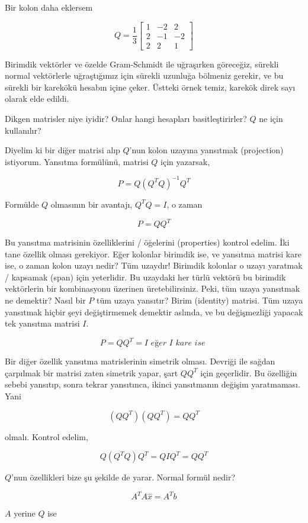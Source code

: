 \documentclass[12pt,fleqn]{article}\usepackage{../../common}
\begin{document}
Bir kolon daha eklersem 

$$Q = \frac{ 1}{3}
\left[\begin{array}{rrr}
1 & -2 & 2\\
2 & -1 & -2 \\
2 & 2 & 1
\end{array}\right]
$$

Birimdik vektörler ve özelde Gram-Schmidt ile uğraşırken göreceğiz,
sürekli normal vektörlerle uğraştığımız için sürekli uzunluğa bölmeniz
gerekir, ve bu sürekli bir karekökü hesabın içine çeker. Üstteki örnek
temiz, karekök direk sayı olarak elde edildi. 

Dikgen matrisler niye iyidir? Onlar hangi hesapları basitleştirirler?
$Q$ ne için kullanılır? 

Diyelim ki bir diğer matrisi alıp $Q$'nun kolon uzayına yansıtmak
(projection) istiyorum. Yansıtma formülünü, matrisi $Q$ için yazarsak,

$$P = Q (Q^TQ)^{-1}Q^T$$

Formülde $Q$ olmasının bir avantajı, $Q^TQ = I$, o zaman 

$$P = Q Q^T$$

Bu yansıtma matrisinin özelliklerini / öğelerini (properties) kontrol
edelim. İki tane özellik olması gerekiyor. Eğer kolonlar birimdik ise, ve
yansıtma matrisi kare ise, o zaman kolon uzayı nedir? Tüm uzaydır!
Birimdik kolonlar o uzayı yaratmak / kapsamak (span) için
yeterlidir. Bu uzaydaki her türlü vektörü bu birimdik vektörlerin bir
kombinasyonu üzerinen üretebilirsiniz. Peki, tüm uzaya yansıtmak ne
demektir? Nasıl bir $P$ tüm uzaya yansıtır? Birim (identity) matrisi. Tüm
uzaya yansıtmak hiçbir şeyi değiştirmemek demektir aslında, ve bu
değişmezliği yapacak tek yansıtma matrisi $I$. 

$$P = Q Q^T = I \textit{ eğer I kare ise }$$

Bir diğer özellik yansıtma matrislerinin simetrik olması. Devriği ile
sağdan çarpılmak bir matrisi zaten simetrik yapar, şart $QQ^T$ için
geçerlidir. Bu özelliğin sebebi yansıtıp, sonra tekrar yansıtınca, ikinci
yansıtmanın değişim yaratmaması. Yani 

$$(QQ^T)(QQ^T) = QQ^T$$

olmalı. Kontrol edelim,

$$Q(Q^TQ)Q^T = QIQ^T = QQ^T$$

$Q$'nun özellikleri bize şu şekilde de yarar. Normal formül nedir? 

$$A^TA\hat{x} = A^Tb$$

$A$ yerine $Q$ ise
\end{document}

